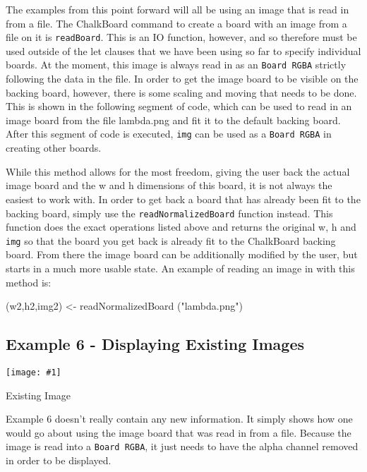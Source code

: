 \documentclass{article}
\newcommand{\floatimg}[3]{%
\begin{floatingfigure}[r]{0.35\textwidth} 
\texttt{[image: \#1]}
\caption{#2}\label{#3}
\end{floatingfigure}}
\begin{document}
The examples from this point forward will all be using an image that is read in from a file.
The ChalkBoard command to create a board with an image from a file on it is \texttt{readBoard}.
This is an IO function, however, and so therefore must be used outside of the let clauses that
we have been using so far to specify individual boards. At the moment, this image is always read
in as an \texttt{Board RGBA} strictly following the data in the file. In order to get the image
board to be visible on the backing board, however, there is some scaling and moving that needs to
be done. This is shown in the following segment of code, which can be used to read in an image
board from the file lambda.png and fit it to the default backing board. After this segment of code
is executed, \texttt{img} can be used as a \texttt{Board RGBA} in creating other boards.


While this method allows for the most freedom, giving the user back the actual image board and the
w and h dimensions of this board, it is not always the easiest to work with. In order to get back
a board that has already been fit to the backing board, simply use the \texttt{readNormalizedBoard}
function instead. This function does the exact operations listed above and returns the original w, h
and \texttt{img} so that the board you get back is already fit to the ChalkBoard backing board. From
there the image board can be additionally modified by the user, but starts in a much more usable state.
An example of reading an image in with this method is:

\begin{DSL}
(w2,h2,img2) <- readNormalizedBoard ("lambda.png")
\end{DSL}

\newpage
\subsection{Example 6 - Displaying Existing Images}

\floatimg{ex6.png}{Existing Image}{fig:ex6}%
Example 6 doesn't really contain any new information. It simply shows how one would go about using the image
board that was read in from a file. Because the image is read into a \texttt{Board RGBA}, it just needs
to have the alpha channel removed in order to be displayed.
\end{document}
